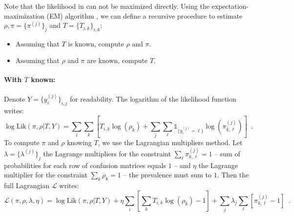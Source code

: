 Note that the likelihood in  can not be maximized directly.
Using the expectation-maximization (EM) algorithm \citep{Dempster_Laird_Rubin77}, we can define a recursive procedure to estimate $\rho,\pi=\{\pi^{(j)}\}_j$ and $T=\{T_{i,k}\}_{i,k}$:
\begin{itemize}
    \item Assuming that $T$ is known, compute $\rho$ and $\pi$.
    \item Assuming that $\rho$ and $\pi$ are known, compute $T$.
\end{itemize}

\paragraph{With $T$ known: }
Denote $Y=\{y_i^{(j)}\}_{i,j}$ for readability.
The logarithm of the likelihood function writes:
\begin{equation*}
    \log \text{Lik}(\pi,\rho|T, Y) = \sum_{i} \sum_{k} \left[T_{i,k} \log (\rho_k) + \sum_j \sum_\ell \mathds{1}_{\{y_i^{(j)}=\ell\}}\log(\pi^{(j)}_{k,\ell})\right] \enspace.
\end{equation*}
To compute $\pi$ and $\rho$ knowing $T$, we use the Lagrangian multipliers method. Let $\lambda=\{\lambda^{(j)}\}_{j}$ the Lagrange multipliers for the constraint $\sum_\ell \pi_{k,\ell}^{(j)}=1$ -- sum of probabilities for each row of confusion matrices equals $1$ -- and $\eta$ the Lagrange multiplier for the constraint $\sum_k \rho_k=1$ -- the prevalence must sum to $1$. Then the full Lagrangian $\mathcal{L}$ writes:
\begin{equation*}
        \mathcal{L}(\pi,\rho,\lambda,\eta) = \log \text{Lik}(\pi,\rho|T, Y)  + \eta\sum_i \left[\sum_k T_{i,k} \log(\rho_k) - 1\right]
        + \sum_j \lambda_{j}\sum_\ell\left[\pi^{(j)}_{k,\ell} - 1\right]
        \enspace.
\end{equation*}

